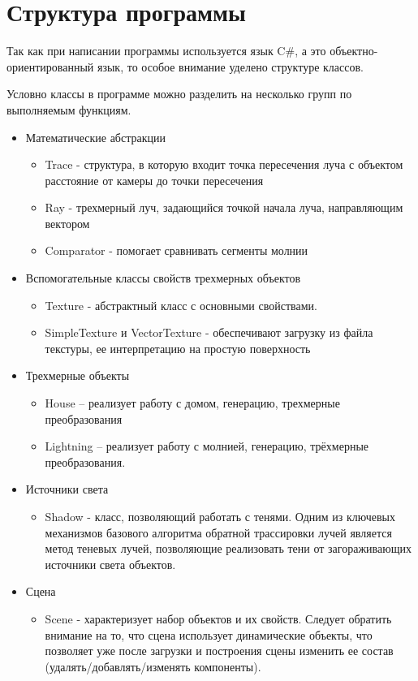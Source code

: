 \section{Структура программы}
Так как при написании программы используется язык C\#, а это объектно-ориентированный язык, то особое внимание уделено структуре классов.

Условно классы в программе можно разделить на несколько групп по выполняемым функциям.
  
\begin{itemize}
	\item Математические абстракции
	\begin{itemize}
		\item Trace - структура, в которую входит точка пересечения луча с объектом расстояние от камеры до точки пересечения
		\item Ray - трехмерный луч, задающийся точкой начала луча, направляющим вектором
		\item Comparator - помогает сравнивать сегменты молнии
	\end{itemize}
	\item Вспомогательные классы свойств трехмерных объектов
	\begin{itemize}
		\item Texture - абстрактный класс с основными свойствами.
		\item SimpleTexture и VectorTexture - обеспечивают загрузку из файла текстуры, ее интерпретацию на простую поверхность
	\end{itemize}
	\item Трехмерные объекты
	\begin{itemize}
		\item House – реализует работу с домом, генерацию, трехмерные преобразования
		\item Lightning – реализует работу с молнией, генерацию, трёхмерные преобразования.
	\end{itemize}
	\item Источники света
	\begin{itemize}
		\item Shadow - класс, позволяющий работать с тенями. Одним из ключевых механизмов базового алгоритма обратной трассировки лучей является метод теневых лучей, позволяющие реализовать тени от загораживающих источники света объектов.
	\end{itemize}
	\item Сцена
	\begin{itemize}
		\item Scene - характеризует набор объектов и их свойств. Следует обратить внимание на то, что сцена использует динамические объекты, что позволяет уже после загрузки и построения сцены изменить ее состав (удалять/добавлять/изменять компоненты).

\end{itemize}
\end{itemize}
